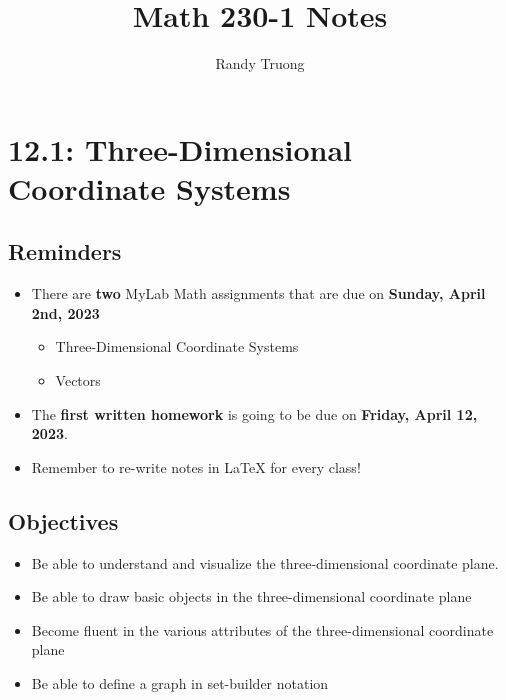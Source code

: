 \documentclass{report}
\title{Math 230-1 Notes}
\date{}
\author{Randy Truong}
\begin{document}
\maketitle
\begin{sloppypar}
  \tableofcontents

\chapter{12.1: Three-Dimensional Coordinate Systems}
\section{Reminders}
\begin{itemize}
  \item There are \textbf{two} MyLab Math
        assignments that are due on
        \textbf{Sunday, April 2nd, 2023}
        \begin{itemize}f
          \item Three-Dimensional
                Coordinate Systems
          \item Vectors

        \end{itemize}


  \item The \textbf{first
        written homework} is
        going to be due on \textbf{Friday,
        April 12, 2023}.

  \item Remember to re-write notes in LaTeX
        for every class!
\end{itemize}

\section{Objectives}
\begin{itemize}
  \item Be able to understand and visualize
        the three-dimensional coordinate
        plane.
  \item Be able to draw basic
        objects in the three-dimensional
        coordinate plane
  \item Become fluent in the various
        attributes of the three-dimensional
        coordinate plane
  \item Be able to define a graph
        in set-builder notation
\end{itemize}


\end{sloppypar}
\end{document}
